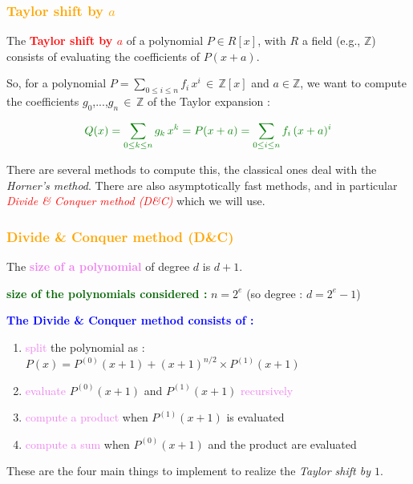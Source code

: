 \begin{frame}[fragile]
\frametitle{\textbf{\textcolor{orange}{Taylor shift by $a$}}}

\begin{Definition}
The \textcolor{red}{\textbf{Taylor shift by $a$}} of a polynomial $P\in R[x]$, with $R$ a field (e.g., $\mathbb{Z}$) consists of evaluating the coefficients of $P(x+a)$.
\end{Definition}

So, for a polynomial $P=\sum_{0\leq i \leq n} f_i\,x^i\, \in \, \mathbb{Z}[x]$ and $a\in\mathbb{Z}$, we want to compute the coefficients $g_0$,...,$g_n\,\in\,\mathbb{Z}$ of the Taylor expansion :

$$\textcolor{darkgreen}{Q(x)=\sum_{0\leq k \leq n}g_k\, x^k=P(x+a)=\sum_{0\leq i \leq n}f_i\, (x+a)^i}$$ 

There are several methods to compute this, the classical ones deal with the \textit{Horner's method}. There are also asymptotically fast methods, and in particular \textcolor{red}{\textit{Divide \& Conquer method (D{\&}C)}} which we will use.

\end{frame}

\begin{frame}[fragile]
\frametitle{\textbf{\textcolor{orange}{Divide \& Conquer method (D{\&}C)}}}

\begin{Definition}
The \textcolor{violet}{\textbf{size of a polynomial}} of degree $d$ is $d+1$.
\end{Definition}

\textcolor{darkgreen}{\textbf{size of the polynomials considered :}} $n = 2^e$ (so degree : $d = 2^e - 1$)

\begin{block}{}
\textcolor{blue}{\textbf{The Divide \& Conquer method consists of :}}

\begin{enumerate}
\item \textcolor{violet}{split} the polynomial as : $P(x) = P^{(0)}(x+1)+(x+1)^{n/2}\times P^{(1)}(x+1)$
\item \textcolor{violet}{evaluate} $P^{(0)}(x+1)$ and $P^{(1)}(x+1)$ \textcolor{violet}{recursively}
\item \textcolor{violet}{compute a product} when $P^{(1)}(x+1)$ is evaluated
\item \textcolor{violet}{compute a sum} when $P^{(0)}(x+1)$ and the product are evaluated
\end{enumerate}
\end{block}

These are the four main things to implement to realize the \textit{Taylor shift by $1$}.

\end{frame}

